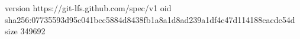 version https://git-lfs.github.com/spec/v1
oid sha256:07735593d95c041bcc5884d8438fb1a8a1d8ad239a1df4c47d114188cacdc54d
size 349692
